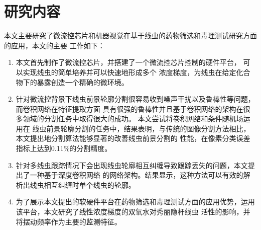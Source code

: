 \section{研究内容}
\label{sec:intro:org}
	本文主要研究了微流控芯片和机器视觉在基于线虫的药物筛选和毒理测试研究方面的应用，本文的主要
	工作如下：
	\begin{enumerate}
	  \item 本文首先制作了微流控芯片，并搭建了一个微流控芯片控制的硬件平台，
	  可以实现线虫的简单培养并可以快速地形成多个
	  浓度梯度，为线虫在给定化合物下的暴露创造一个精确的微环境。
	  \item 针对微流控背景下线虫前景轮廓分割很容易收到噪声干扰以及鲁棒性等问题，而卷积网络在特征提取方面
	  具有很强的鲁棒性并且基于卷积网络的架构在很多领域的分割任务中取得很大的成功。
	  本文尝试将卷积网络和条件随机场运用在
	  线虫前景轮廓分割的任务中，结果表明，与传统的图像分割方法相比，本文提出地分割算法能够显著的改善线虫前景分割的
	  性能，在像素分类误差指标上达到0.11\%的分割精度。
	  \item 针对多线虫跟踪情况下会出现线虫轮廓相互纠缠导致跟踪丢失的问题，本文提出了一种基于深度卷积网络
	  的网络架构。结果显示，这种方法可以有效的解析出线虫相互纠缠时单个线虫的轮廓。
	  \item 为了展示本文提出的软硬件平台在药物筛选和毒理测试方面的应用优势，运用该平台，本文研究了线性浓度梯度的双氧水对秀丽隐杆线虫
	  活性的影响，并将摆动频率作为主要的监测特征。
	\end{enumerate}
	
